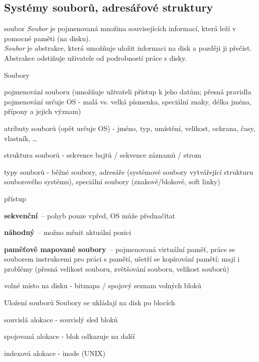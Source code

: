 \subsection{Systémy souborů, adresářové struktury}

\begin{definiceN}{soubor}
  \emph{Soubor} je pojmenovaná množina souvisejících informací, která leží v
  pomocné paměti (na disku).\\
  \emph{Soubor} je abstrakce, která umožňuje uložit informaci na disk a později ji
  přečíst. Abstrakce odstiňuje uživatele od podrobností práce s disky.
\end{definiceN}

\begin{obecne}{Soubory}
  \begin{pitemize}
    \item pojmenování souboru (umožňuje uživateli přístup k jeho datům;
    přesná pravidla pojmenování určuje OS - malá vs. velká písmenka,
    speciální znaky, délka jména, přípony a jejich význam)
    \item atributy souborů (opět určuje OS) - jméno, typ, umístění, velikost, ochrana, časy, vlastník, \dots
    \item struktura souborů - sekvence bajtů / sekvence záznamů / strom
    \item typy souborů - běžné soubory, adresáře (systémové soubory vytvářející strukturu souborového systému), speciální soubory (znakové/blokové, soft linky)
    \item přístup 
    \begin{pitemize}
      \item \textbf{sekvenční}~-- pohyb pouze vpřed, OS může přednačítat
      \item \textbf{náhodný}~-- možno měnit aktuální pozici
      \item \textbf{paměťově mapované soubory}~-- pojmenovaná virtuální paměť,
      práce se souborem instrukcemi pro práci s pamětí, ušetří se kopírování
      pamětí; mají i problémy (přesná velikost souboru, zvětšování souboru,
      velikost souborů)
    \end{pitemize}
    \item volné místo na disku - bitmapa / spojový seznam volných bloků 
  \end{pitemize}
\end{obecne}

\begin{obecne}{Uložení souborů}
  Soubory se ukládají na disk po blocích
  \begin{pitemize}
    \item souvislá alokace - souvislý sled bloků
    \item spojovaná alokace - blok odkazuje na další
    \item indexová alokace - inode (UNIX) 
  \end{pitemize}
\end{obecne}

